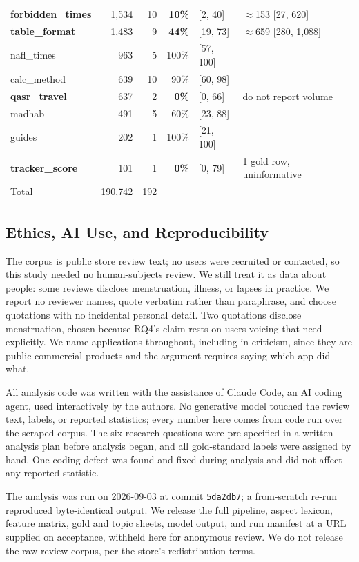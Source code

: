 \begin{table}[t]
\begin{tabular}{lrrrll}
    \textbf{forbidden\_times}    & 1{,}534 & 10 & \textbf{10\%} & [2, 40]  & \(\approx\)153 [27, 620] \\
    \textbf{table\_format}       & 1{,}483 & 9  & \textbf{44\%} & [19, 73] & \(\approx\)659 [280, 1{,}088] \\
    nafl\_times             & 963      & 5  & 100\% & [57, 100] & \\
    calc\_method            & 639      & 10 & 90\%  & [60, 98]  & \\
    \textbf{qasr\_travel}        & 637      & 2  & \textbf{0\%}  & [0, 66]  & do not report volume \\
    madhab                  & 491      & 5  & 60\%  & [23, 88]  & \\
    guides                  & 202      & 1  & 100\% & [21, 100] & \\
    \textbf{tracker\_score}      & 101      & 1  & \textbf{0\%}  & [0, 79]  & 1 gold row, uninformative \\
    \midrule
    Total                   & 190{,}742 & 192 & & & \\
    \bottomrule
  \end{tabular}
\end{table}

\subsection{Ethics, AI Use, and Reproducibility}
\label{sec:method-ethics}
\label{sec:method-ai}
\label{sec:method-repro}

The corpus is public store review text; no users were recruited or contacted,
so this study needed no human-subjects review. We still treat it as data about
people: some reviews disclose menstruation, illness, or lapses in practice. We
report no reviewer names, quote verbatim rather than paraphrase, and choose
quotations with no incidental personal detail. Two quotations disclose
menstruation, chosen because RQ4's claim rests on users voicing that need
explicitly. We name applications throughout, including in criticism, since
they are public commercial products and the argument requires saying which app
did what.

All analysis code was written with the assistance of Claude Code, an AI coding
agent, used interactively by the authors. No generative model touched the
review text, labels, or reported statistics; every number here comes from code
run over the scraped corpus. The six research questions were pre-specified in
a written analysis plan before analysis began, and all gold-standard labels
were assigned by hand. One coding defect was found and fixed during analysis
and did not affect any reported statistic.

The analysis was run on 2026-09-03 at commit \texttt{5da2db7}; a from-scratch
re-run reproduced byte-identical output. We release the full pipeline, aspect
lexicon, feature matrix, gold and topic sheets, model output, and run manifest
at a URL supplied on acceptance, withheld here for anonymous review. We do not
release the raw review corpus, per the store's redistribution terms.
